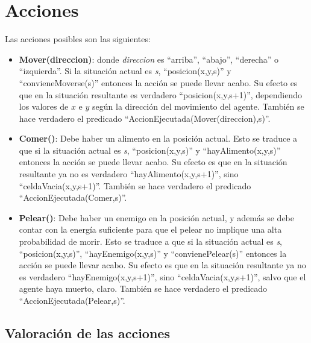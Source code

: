 \section{Acciones}

Las acciones posibles son las siguientes:

\begin{itemize}

\item \textbf{Mover(direccion)}: donde \emph{direccion} es ``arriba'',
``abajo'', ``derecha'' o ``izquierda''. Si la situación actual es \emph{s},
``posicion(x,y,s)'' y ``convieneMoverse(s)'' entonces la acción se puede llevar
acabo. Su efecto es que en la situación resultante es verdadero
``posicion(x,y,s+1)'', dependiendo los valores de $x$ e $y$ según la dirección
del movimiento del agente. También se hace verdadero el predicado ``AccionEjecutada(Mover(direccion),s)''.

\item \textbf{Comer()}: Debe haber un alimento en la posición actual. Esto se
traduce a que si la situación actual es \emph{s}, ``posicion(x,y,s)'' y
``hayAlimento(x,y,s)'' entonces la acción se puede llevar acabo. Su efecto es
que en la situación resultante ya no es verdadero ``hayAlimento(x,y,s+1)'',
sino ``celdaVacia(x,y,s+1)''. También se hace verdadero el predicado ``AccionEjecutada(Comer,s)''.

\item \textbf{Pelear()}: Debe haber un enemigo en la posición actual, y además
se debe contar con la energía suficiente para que el pelear no implique una
alta probabilidad de morir. Esto se traduce a que si la situación actual es
\emph{s}, ``posicion(x,y,s)'', ``hayEnemigo(x,y,s)'' y ``convienePelear(s)''
entonces la acción se puede llevar acabo. Su efecto es que en la situación
resultante ya no es verdadero ``hayEnemigo(x,y,s+1)'', sino
``celdaVacia(x,y,s+1)'', salvo que el agente haya muerto, claro. También se hace verdadero el predicado ``AccionEjecutada(Pelear,s)''.

\end{itemize}

\subsection{Valoración de las acciones}

